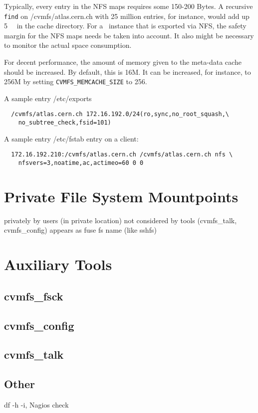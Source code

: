 Typically, every entry in the NFS maps requires some 150-200 Bytes. 
A recursive \texttt{find} on /cvmfs/atlas.cern.ch with 25 million entries, for instance, would add up \SI{5}{\giga\byte} in the cache directory. 
For a \cvmfs\ instance that is exported via NFS, the safety margin for the NFS maps needs be taken into account.
It also might be necessary to monitor the actual space consumption.

For decent performance, the amount of memory given to the meta-data cache should be increased. 
By default, this is 16M.
It can be increased, for instance, to 256M by setting \texttt{CVMFS\_MEMCACHE\_SIZE} to 256.

A sample entry /etc/exports
\begin{verbatim}
  /cvmfs/atlas.cern.ch 172.16.192.0/24(ro,sync,no_root_squash,\
    no_subtree_check,fsid=101)
\end{verbatim}
A sample entry /etc/fstab entry on a client:
\begin{verbatim}
  172.16.192.210:/cvmfs/atlas.cern.ch /cvmfs/atlas.cern.ch nfs \
    nfsvers=3,noatime,ac,actimeo=60 0 0
\end{verbatim}


\section{Private File System Mountpoints}
privately by users (in private location)
not considered by tools (cvmfs\_talk, cvmfs\_config)
appears as fuse fs name (like sshfs)


\section{Auxiliary Tools}
\label{sct:tools}

\subsection{cvmfs\_fsck}

\subsection{cvmfs\_config}

\subsection{cvmfs\_talk}

\subsection{Other}
df -h -i, 
Nagios check

